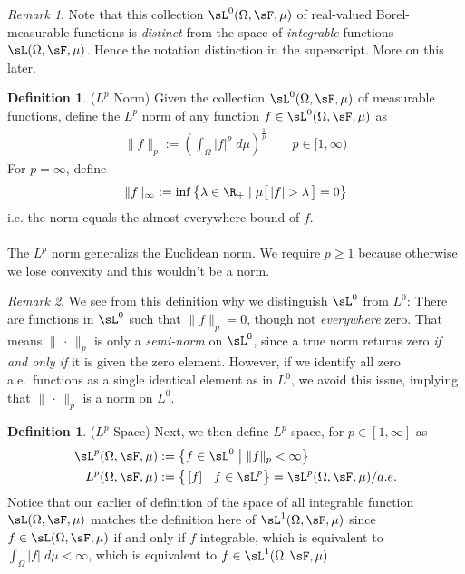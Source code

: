 \documentclass[12pt]{article}
\theoremstyle{plain}
\theoremstyle{definition}
\newtheorem{defn}[thm]{Definition}
\theoremstyle{remark}
\newtheorem*{rmk}{Remark}
\begin{document}
\begin{rmk}
Note that this collection $\sL^0(\Omega,\sF,\mu)$ of real-valued
Borel-measurable functions is \emph{distinct} from the space of
\emph{integrable} functions $\sL(\Omega,\sF,\mu)$.
Hence the notation distinction in the superscript.
More on this later.
\end{rmk}

\begin{defn}($L^p$ Norm)
Given the collection $\sL^0(\Omega,\sF,\mu)$ of measurable functions,
define the $L^p$ norm of any function $f\in\sL^0(\Omega,\sF,\mu)$ as
\begin{align*}
  \lVert f\rVert_p := \left(\int_\Omega |f|^p\;d\mu\right)^{\frac{1}{p}}
  \qquad p \in [1,\infty)
\end{align*}
For $p=\infty$, define
\begin{align*}
  \lVert f\rVert_\infty := \inf\big\{\lambda \in\R_+ \;|\;
  \mu\big[\,|f|>\lambda\,\big]=0\big\}
\end{align*}
i.e. the norm equals the almost-everywhere bound of $f$.
\\
\\
The $L^p$ norm generalizs the Euclidean norm.
We require $p\geq 1$ because otherwise we lose convexity and this
wouldn't be a norm.
\end{defn}
\begin{rmk}
We see from this definition why we distinguish $\sL^0$ from $L^0$:
There are functions in $\sL^0$ such that $\lVert f\rVert_p = 0$, though
not \emph{everywhere} zero.
That means $\lVert \,\cdot\,\rVert_p$ is only a \emph{semi-norm} on
$\sL^0$, since a true norm returns zero \emph{if and only if}
it is given the zero element.
However, if we identify all zero a.e.\ functions as a single identical
element as in $L^0$, we avoid this issue, implying that
$\lVert \,\cdot\,\rVert_p$ is a norm on $L^0$.
\end{rmk}

\begin{defn}($L^p$ Space)
Next, we then define $L^p$ space, for $p\in[1,\infty]$ as
\begin{align*}
    \sL^p(\Omega,\sF,\mu)
    &:=\left\{ f\in\sL^0 \;\big|\; \lVert  f\rVert_p < \infty\right\} \\
    L^p(\Omega,\sF,\mu)
    &:=
    \big\{ \, [f] \; \big| \; f \in\sL^p\big\}
    = \sL^p(\Omega,\sF,\mu)/a.e.
\end{align*}
Notice that our earlier of definition of the space of all integrable
function $\sL(\Omega,\sF,\mu)$ matches the definition here of
$\sL^1(\Omega,\sF,\mu)$ since $f\in\sL(\Omega,\sF,\mu)$ if and only if
$f$ integrable, which is equivalent to
$\int_\Omega |f| \; d\mu <\infty$, which is equivalent to
$f\in\sL^1(\Omega,\sF,\mu)$
\end{defn}
\end{document}
